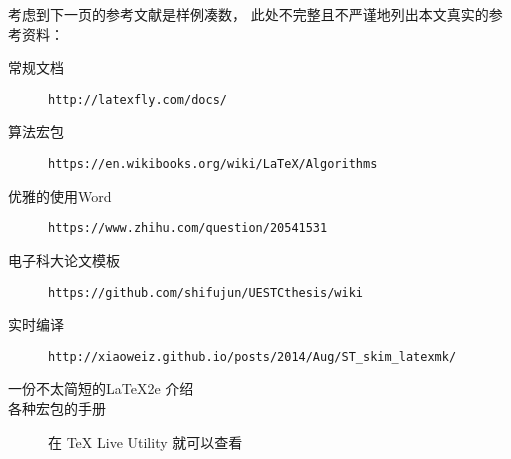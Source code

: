考虑到下一页的参考文献是样例凑数，
此处不完整且不严谨地列出本文真实的参考资料：
\begin{description}
    \item[常规文档] \texttt{http://latexfly.com/docs/}
    \item[算法宏包] \texttt{https://en.wikibooks.org/wiki/LaTeX/Algorithms}
    \item[优雅的使用Word] \texttt{https://www.zhihu.com/question/20541531}
    \item[电子科大论文模板] \texttt{https://github.com/shifujun/UESTCthesis/wiki}
    \item[实时编译] \texttt{http://xiaoweiz.github.io/posts/2014/Aug/ST\_skim\_latexmk/}
    \item[一份不太简短的\LaTeX2e 介绍]   
    \item[各种宏包的手册] 在 TeX Live Utility 就可以查看
\end{description}
